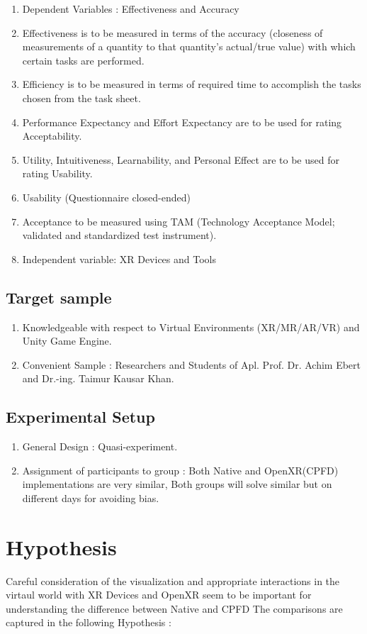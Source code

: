 \documentclass{article}
\begin{document}
\begin{enumerate}[label=\textbf{\alph*}]
	\item Dependent Variables : Effectiveness and Accuracy
	\item Effectiveness is to be measured in terms of the accuracy (closeness of measurements of a quantity to that quantity’s actual/true value) with which certain tasks are performed.
	\item Efficiency is to be measured in terms of required time to accomplish the tasks chosen from the task sheet.
	\item Performance Expectancy and Effort Expectancy are to be used for rating Acceptability.
	\item Utility, Intuitiveness, Learnability, and Personal Effect are to be used for rating Usability.
	\item Usability (Questionnaire closed-ended)
	\item Acceptance to be measured using TAM (Technology Acceptance Model; validated and standardized test instrument).
	\item Independent variable: XR Devices and Tools
\end{enumerate}

\subsection{Target sample}
\begin{enumerate}[label=\textbf{\alph*}]
	\item Knowledgeable with respect to Virtual Environments (XR/MR/AR/VR) and Unity Game Engine.
	\item Convenient Sample : Researchers and Students of Apl. Prof. Dr. Achim Ebert and Dr.-ing. Taimur Kausar Khan.
\end{enumerate}

\subsection{Experimental Setup}
\begin{enumerate}[label=\textbf{\alph*}]
	\item General Design : Quasi-experiment.
	\item Assignment of participants to group : Both Native and OpenXR(CPFD) implementations are very similar, Both groups will solve similar but on different days for avoiding bias.
\end{enumerate}

\section{Hypothesis}
Careful consideration of the visualization and appropriate interactions in the virtaul world with XR Devices and OpenXR seem to be important for understanding the difference between Native and CPFD
The comparisons are captured in the following Hypothesis :
\end{document}
